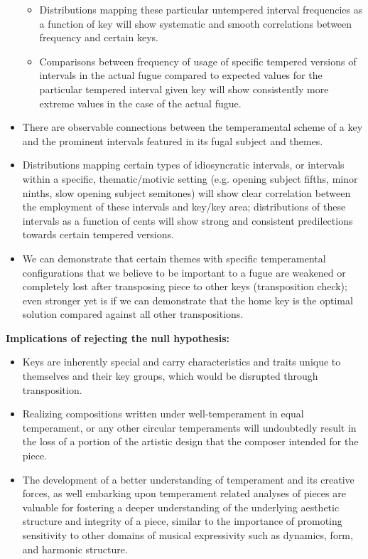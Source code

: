\begin{itemize}
  \begin{itemize}
  \tightlist
  \item
    Distributions mapping these particular untempered interval
    frequencies as a function of key will show systematic and smooth
    correlations between frequency and certain keys.
  \item
    Comparisons between frequency of usage of specific tempered versions
    of intervals in the actual fugue compared to expected values for the
    particular tempered interval given key will show consistently more
    extreme values in the case of the actual fugue.
  \end{itemize}
\item
  There are observable connections between the temperamental scheme of a
  key and the prominent intervals featured in its fugal subject and
  themes.
\item
  Distributions mapping certain types of idiosyncratic intervals, or
  intervals within a specific, thematic/motivic setting (e.g. opening
  subject fifths, minor ninths, slow opening subject semitones) will
  show clear correlation between the employment of these intervals and
  key/key area; distributions of these intervals as a function of cents
  will show strong and consistent predilections towards certain tempered
  versions.
\item
  We can demonstrate that certain themes with specific temperamental
  configurations that we believe to be important to a fugue are weakened
  or completely lost after transposing piece to other keys
  (transposition check); even stronger yet is if we can demonstrate that
  the home key is the optimal solution compared against all other
  transpositions.
\end{itemize}

\textbf{Implications of rejecting the null hypothesis:}

\begin{itemize}
\tightlist
\item
  Keys are inherently special and carry characteristics and traits
  unique to themselves and their key groups, which would be disrupted
  through transposition.
\item
  Realizing compositions written under well-temperament in equal
  temperament, or any other circular temperaments will undoubtedly
  result in the loss of a portion of the artistic design that the
  composer intended for the piece.
\item
  The development of a better understanding of temperament and its
  creative forces, as well embarking upon temperament related analyses
  of pieces are valuable for fostering a deeper understanding of the
  underlying aesthetic structure and integrity of a piece, similar to
  the importance of promoting sensitivity to other domains of musical
  expressivity such as dynamics, form, and harmonic structure.
\end{itemize}

